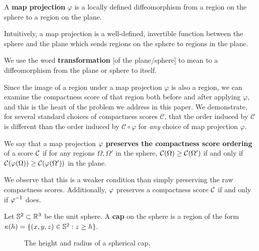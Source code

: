 \begin{definition}
  A \textbf{map projection} $\varphi$ is a locally defined 
  diffeomorphism from a region on the sphere to a region on the 
  plane. 
\end{definition}

Intuitively, a map projection is a well-defined, invertible function between the sphere and the plane which sends regions on the sphere to regions in the plane.

\begin{definition}
  We use the word \textbf{transformation} [of the plane/sphere] to mean
  to a diffeomorphism from the plane or sphere to itself.
\end{definition}

Since the image of a region under a map projection $\varphi$ is also
a region, we can examine the compactness score of that region both 
before and after applying $\varphi$, and this is the heart of the
problem we address in this paper.  We demonstrate, for several
standard choices of compactness scores $\mathcal{C}$, that the order
induced by $\mathcal{C}$ is different than the order induced by
$\mathcal{C}\circ\varphi$ for \textit{any} choice of map projection
$\varphi$.

\begin{definition}
  We say that a map projection $\varphi$ \textbf{preserves the  
  compactness score ordering} of a score $\mathcal{C}$ if for any regions 
  $\Omega,\Omega'$ in the sphere, $\mathcal{C}(\Omega)\ge \mathcal{C}(\Omega')$ 
  if and only if $\mathcal{C}(\varphi(\Omega)) \ge \mathcal{C}(\varphi(\Omega'))$ in the plane.
\end{definition}

  We observe that this is a weaker condition than simply preserving the raw compactness scores.  Additionally, $\varphi$ preserves a compactness score $\mathcal{C}$ 
  if and only if $\varphi^{-1}$ does.

\begin{definition}
  Let $\mathbb{S}^2\subset \mathbb{R}^3$ be the unit sphere. A 
  \textbf{cap} on the sphere is a region of the 
  form $\kappa(h) = \{(x,y,z)\in \mathbb{S}^2: z\ge h\}$.
\end{definition}

\begin{figure}[h]
  \centering
  
  \caption{ The height and radius of a spherical cap. }
  \label{fig:caphr}
\end{figure}






